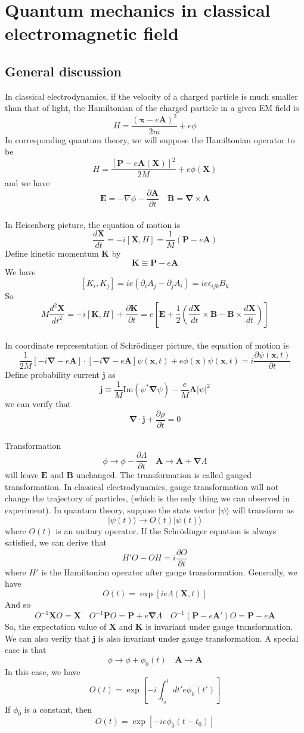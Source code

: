 \section{Quantum mechanics in classical electromagnetic field}
\subsection{General discussion}
In classical electrodynamics, if the velocity of a charged particle is much smaller than that of light, the Hamiltonian of the charged particle in a given EM field is
\[H = \frac{(\bm{\pi}-e\bm{A})^2}{2m} + e\phi\]
In corresponding quantum theory, we will suppose the Hamiltonian operator to be
\[H = \frac{[\bm{P}-e\bm{A}(\bm{X})]^2}{2M} + e\phi(\bm{X})\]
and we have
\[\bm{E} = -\nabla\phi - \frac{\partial \bm{A}}{\partial t} \quad \bm{B} = \bm{\nabla}\times\bm{A}\]
\\
In Heisenberg picture, the equation of motion is
\[\frac{d\bm{X}}{dt} = -i[\bm{X},H] = \frac{1}{M}(\bm{P}-e\bm{A})\]
Define kinetic momentum $\bm{K}$ by
\[\bm{K} \equiv \bm{P}-e\bm{A}\]
We have
\[[K_i,K_j] = ie(\partial_i A_j-\partial_j A_i) = ie\epsilon_{ijk}B_k\]
So
\[M \frac{d^2\bm{X}}{dt^2} = -i[\bm{K},H] + \frac{\partial \bm{K}}{\partial t} = e \left[ \bm{E}+ \frac{1}{2} \left( \frac{d\bm{X}}{dt} \times \bm{B} - \bm{B}\times\frac{d\bm{X}}{dt} \right) \right]\]
\\
In coordinate representation of Schrödinger picture, the equation of motion is
\[\frac{1}{2M} \left[ -i\bm{\nabla}-e\bm{A} \right] \cdot \left[ -i\bm{\nabla}-e\bm{A} \right] \psi(\bm{x},t) + e\phi(\bm{x})\psi(\bm{x},t) = i \frac{\partial \psi(\bm{x},t)}{\partial t}\]
Define probability current $\bm{j}$ as
\[\bm{j} \equiv \frac{1}{M} \mathrm{Im}(\psi^{*}\bm{\nabla}\psi) - \frac{e}{M}\bm{A}|\psi|^2\]
we can verify that
\[\bm{\nabla}\cdot\bm{j} + \frac{\partial \rho}{\partial t} = 0\]
\\
Transformation
\[\phi \to \phi - \frac{\partial \Lambda}{\partial t} \quad \bm{A} \to \bm{A} + \bm{\nabla}\Lambda\]
will leave $\bm{E}$ and $\bm{B}$ unchanged. The transformation is called gauged transformation. In classical electrodynamics, gauge transformation will not change the trajectory of particles, (which is the only thing we can observed in experiment). In quantum theory, suppose the state vector $|\psi\rangle$ will transform as 
\[|\psi(t)\rangle \to O(t)|\psi(t)\rangle\]
where $O(t)$ is an unitary operator. If the Schrödinger equation is always satisfied, we can derive that
\[H'O - OH = i\frac{\partial O}{\partial t}\]
where $H'$ is the Hamiltonian operator after gauge transformation. Generally, we have
\[O(t) = \exp \left[ ie\Lambda(\bm{X},t)\right]\]
And so
\[O^{-1} \bm{X} O = \bm{X} \quad O^{-1} \bm{P} O = \bm{P} + e\bm{\nabla}\Lambda \quad O^{-1}(\bm{P}-e\bm{A}')O = \bm{P} - e\bm{A}\]
So, the expectation value of $\bm{X}$ and $\bm{K}$ is invariant under gauge transformation. We can also verify that $\bm{j}$ is also invariant under gauge transformation.
A special case is that
\[\phi \to \phi+\phi_0(t) \quad \bm{A} \to \bm{A}\]
In this case, we have
\[O(t) = \exp \left[ -i \int_{t_0}^{t} dt' e\phi_0(t') \right]\]
If $\phi_0$ is a constant, then
\[O(t) = \exp \left[ -ie\phi_0(t-t_0) \right]\]

